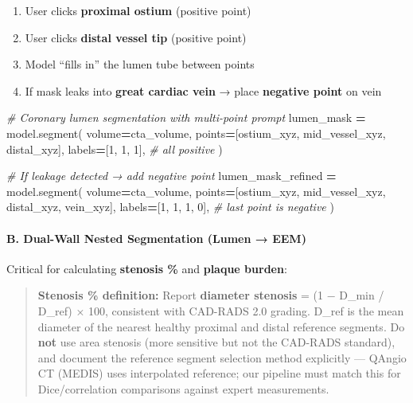 \documentclass[
  11pt,
]{article}
\newenvironment{Shaded}{\begin{snugshade}}{\end{snugshade}}
\newcommand{\CommentTok}[1]{\textcolor[rgb]{0.56,0.35,0.01}{\textit{#1}}}
\newcommand{\DecValTok}[1]{\textcolor[rgb]{0.00,0.00,0.81}{#1}}
\newcommand{\NormalTok}[1]{#1}
\newcommand{\OperatorTok}[1]{\textcolor[rgb]{0.81,0.36,0.00}{\textbf{#1}}}
\providecommand{\tightlist}{%
  \setlength{\itemsep}{0pt}\setlength{\parskip}{0pt}}
\begin{document}
\begin{enumerate}
\def\labelenumi{\arabic{enumi}.}
\tightlist
\item
  User clicks \textbf{proximal ostium} (positive point)
\item
  User clicks \textbf{distal vessel tip} (positive point)
\item
  Model ``fills in'' the lumen tube between points
\item
  If mask leaks into \textbf{great cardiac vein} → place
  \textbf{negative point} on vein
\end{enumerate}

\begin{Shaded}
\begin{Highlighting}[]
\CommentTok{\# Coronary lumen segmentation with multi{-}point prompt}
\NormalTok{lumen\_mask }\OperatorTok{=}\NormalTok{ model.segment(}
\NormalTok{    volume}\OperatorTok{=}\NormalTok{cta\_volume,}
\NormalTok{    points}\OperatorTok{=}\NormalTok{[ostium\_xyz, mid\_vessel\_xyz, distal\_xyz],}
\NormalTok{    labels}\OperatorTok{=}\NormalTok{[}\DecValTok{1}\NormalTok{, }\DecValTok{1}\NormalTok{, }\DecValTok{1}\NormalTok{],  }\CommentTok{\# all positive}
\NormalTok{)}

\CommentTok{\# If leakage detected → add negative point}
\NormalTok{lumen\_mask\_refined }\OperatorTok{=}\NormalTok{ model.segment(}
\NormalTok{    volume}\OperatorTok{=}\NormalTok{cta\_volume,}
\NormalTok{    points}\OperatorTok{=}\NormalTok{[ostium\_xyz, mid\_vessel\_xyz, distal\_xyz, vein\_xyz],}
\NormalTok{    labels}\OperatorTok{=}\NormalTok{[}\DecValTok{1}\NormalTok{, }\DecValTok{1}\NormalTok{, }\DecValTok{1}\NormalTok{, }\DecValTok{0}\NormalTok{],  }\CommentTok{\# last point is negative}
\NormalTok{)}
\end{Highlighting}
\end{Shaded}

\paragraph{B. Dual-Wall Nested Segmentation (Lumen →
EEM)}\label{b.-dual-wall-nested-segmentation-lumen-eem}

Critical for calculating \textbf{stenosis \%} and \textbf{plaque
burden}:

\begin{quote}
\textbf{Stenosis \% definition:} Report \textbf{diameter stenosis} = (1
− D\_min / D\_ref) × 100, consistent with CAD-RADS 2.0 grading. D\_ref
is the mean diameter of the nearest healthy proximal and distal
reference segments. Do \textbf{not} use area stenosis (more sensitive
but not the CAD-RADS standard), and document the reference segment
selection method explicitly --- QAngio CT (MEDIS) uses interpolated
reference; our pipeline must match this for Dice/correlation comparisons
against expert measurements.
\end{quote}
\end{document}
